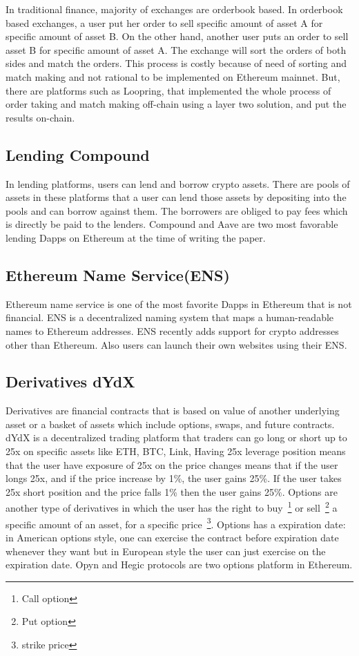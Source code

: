 In traditional finance, majority of exchanges are orderbook based. In orderbook based exchanges, a user put her order to sell specific amount of asset A for specific amount of asset B. On the other hand, another user puts an order to sell asset B for specific amount of asset A. The exchange will sort the orders of both sides and match the orders. This process is costly because of need of sorting and match making and not rational to be implemented on Ethereum mainnet. But, there are platforms such as Loopring, that implemented the whole process of order taking and match making off-chain using a layer two solution, and put the results on-chain.

\subsection{Lending \eg Compound}
In lending platforms, users can lend and borrow crypto assets. There are pools of assets in these platforms that a user can lend those assets by depositing into the pools and can borrow against them. The borrowers are obliged to pay fees which is directly be paid to the lenders. Compound and Aave are two most favorable lending Dapps on Ethereum at the time of writing the paper. 

\subsection{Ethereum Name Service(ENS)}
Ethereum name service is one of the most favorite Dapps in Ethereum that is not financial. ENS is a decentralized naming system that maps a human-readable names to Ethereum addresses. 
ENS recently adds support for crypto addresses other than Ethereum. Also users can launch their own websites using their ENS.

\subsection{Derivatives \eg dYdX}
Derivatives are financial contracts that is based on value of another underlying asset or a basket of assets which include options, swaps, and future contracts. dYdX is a decentralized trading platform that traders can go long or short up to 25x on specific assets like ETH, BTC, Link, \etc
Having 25x leverage position means that the user have exposure of 25x on the price changes means that if the user longs 25x, and if the price increase by 1\%, the user gains 25\%. If the user takes 25x short position and the price falls 1\% then the user gains 25\%.
Options are another type of derivatives in which the user has the right to buy~\footnote{Call option} or sell~\footnote{Put option} a specific amount of an asset, for a specific price~\footnote{strike price}. Options has a expiration date: in American options style, one can exercise the contract before expiration date whenever they want but in European style the user can just exercise on the expiration date. Opyn and Hegic protocols are two options platform in Ethereum.


